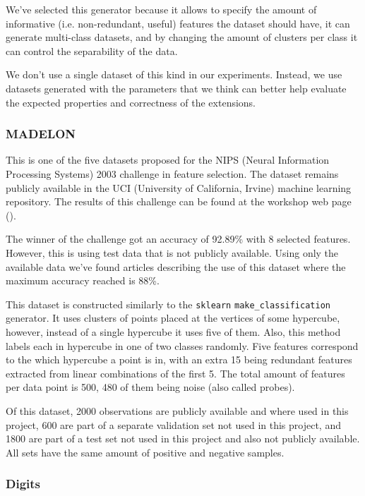 We've selected this generator because it allows to specify the amount of in\-for\-ma\-tive (i.e. non-redundant, useful) features the dataset should have, it can generate multi-class datasets, and by changing the amount of clusters per class it can control the separability of the data.

We don't use a single dataset of this kind in our experiments. Instead, we use datasets generated with the parameters that we think can better help evaluate the expected properties and correctness of the extensions.

\subsubsection*{MADELON}
\label{sec:ch5.data.madelon}

This is one of the five datasets proposed for the NIPS (Neural Information Processing Systems) 2003 challenge in feature selection. The dataset remains publicly available in the UCI (University of California, Irvine) machine learning repository. The results of this challenge can be found at the workshop web page (\cite{guyon_result_2004}).

The winner of the challenge got an accuracy of 92.89\% with 8 selected features. However, this is using test data that is not publicly available. Using only the avail\-able data we've found articles describing the use of this dataset where the maximum accuracy reached is 88\%. 

This dataset is constructed similarly to the \texttt{sklearn} \texttt{make\_classification} gen\-er\-a\-tor. It uses clusters of points placed at the vertices of some hypercube, however, instead of a single hypercube it uses five of them. Also, this method labels each in hypercube in one of two classes randomly. Five features correspond to the which hypercube a point is in, with an extra 15 being redundant features extracted from linear combinations of the first 5. The total amount of features per data point is 500, 480 of them being noise (also called probes).

Of this dataset, 2000 observations are publicly available and where used in this project, 600 are part of a separate validation set not used in this project, and 1800 are part of a test set not used in this project and also not publicly available. All sets have the same amount of positive and negative samples.

\subsubsection*{Digits}

